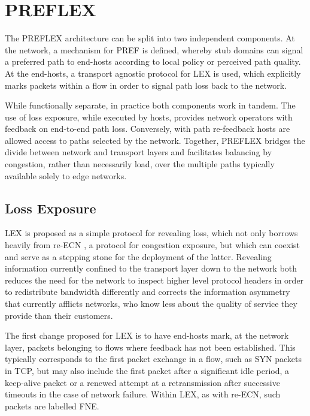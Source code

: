 \section{PREFLEX}

The \ac{PREFLEX} architecture can be split into two independent components. At the network, a mechanism for \ac{PREF} is defined, whereby stub domains can signal a preferred path to end-hosts according to local policy or perceived path quality. At the end-hosts, a transport agnostic protocol for \ac{LEX} is used, which explicitly marks packets within a flow in order to signal path loss back to the network.

While functionally separate, in practice both components work in tandem. The use of loss exposure, while executed by hosts, provides network operators with feedback on end-to-end path loss. Conversely, with path re-feedback hosts are allowed access to paths selected by the network. Together, \ac{PREFLEX} bridges the divide between network and transport layers and facilitates balancing by congestion, rather than necessarily load, over the multiple paths typically available solely to edge networks.

\subsection{Loss Exposure}

\ac{LEX} is proposed as a simple protocol for revealing loss, which not only borrows heavily from re-\ac{ECN} \cite{Briscoe:2008p494}, a protocol for congestion exposure, but which can coexist and serve as a stepping stone for the deployment of the latter. Revealing information currently confined to the transport layer down to the network both reduces the need for the network to inspect higher level protocol headers in order to redistribute bandwidth differently and corrects the information asymmetry that currently afflicts networks, who know less about the quality of service they provide than their customers.

The first change proposed for \ac{LEX} is to have end-hosts mark, at the network layer, packets belonging to flows where feedback has not been established. 
This typically corresponds to the first packet exchange in a flow, such as SYN packets in \ac{TCP}, but may also include the first packet after a significant idle period, a keep-alive packet or a renewed attempt at a retransmission after successive timeouts in the case of network failure. 
Within \ac{LEX}, as with re-\ac{ECN}, such packets are labelled \ac{FNE}.

